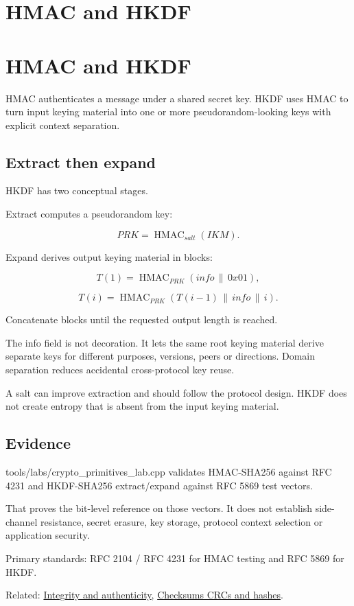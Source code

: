 \hypertarget{appendix-50af792c9da7}{}
\section*{HMAC and HKDF}
\section{HMAC and HKDF}\label{hmac-and-hkdf}

HMAC authenticates a message under a shared secret key. HKDF uses HMAC to turn input keying material into one or more pseudorandom-looking keys with explicit context separation.

\subsection{Extract then expand}\label{extract-then-expand}

HKDF has two conceptual stages.

Extract computes a pseudorandom key:

\[
PRK=\operatorname{HMAC}_{salt}(IKM).
\]

Expand derives output keying material in blocks:

\[
T(1)=\operatorname{HMAC}_{PRK}(info\,\|\,0x01),
\]

\[
T(i)=\operatorname{HMAC}_{PRK}(T(i-1)\,\|\,info\,\|\,i).
\]

Concatenate blocks until the requested output length is reached.

The info field is not decoration. It lets the same root keying material derive separate keys for different purposes, versions, peers or directions. Domain separation reduces accidental cross-protocol key reuse.

A salt can improve extraction and should follow the protocol design. HKDF does not create entropy that is absent from the input keying material.

\subsection{Evidence}\label{evidence}

tools/labs/crypto\_primitives\_lab.cpp validates HMAC-SHA256 against RFC 4231 and HKDF-SHA256 extract/expand against RFC 5869 test vectors.

That proves the bit-level reference on those vectors. It does not establish side-channel resistance, secret erasure, key storage, protocol context selection or application security.

Primary standards: RFC 2104 / RFC 4231 for HMAC testing and RFC 5869 for HKDF.

Related: \hyperref[appendix-cbe594d1ab0a]{Integrity and authenticity}, \hyperref[appendix-ed338677de0a]{Checksums CRCs and hashes}.
